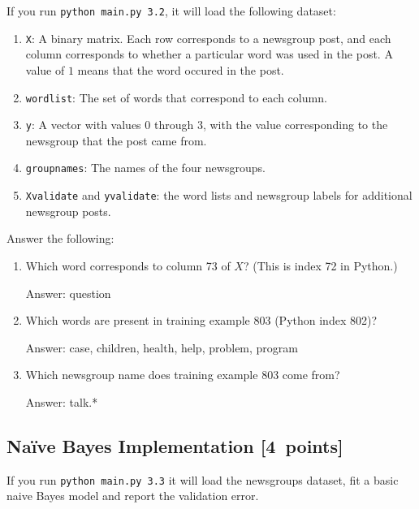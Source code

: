 \documentclass{article}
\newcommand{\blu}[1]{{\textcolor{blu}{#1}}}
\newcommand{\gre}[1]{\textcolor{gre}{#1}}
\newcommand\ans[1]{\par\gre{Answer: #1}}
\let\ask\blu
\newcommand\pts[1]{\textcolor{pointscolour}{[#1~points]}}
\begin{document}
    If you run \texttt{python main.py 3.2}, it will load the following dataset:
    \begin{enumerate}
        \item \texttt{X}: A binary matrix. Each row corresponds to a newsgroup post, and each column corresponds to whether a particular word was used in the post. A value of $1$ means that the word occured in the post.
        \item \texttt{wordlist}: The set of words that correspond to each column.
        \item \texttt{y}: A vector with values $0$ through $3$, with the value corresponding to the newsgroup that the post came from.
        \item \texttt{groupnames}: The names of the four newsgroups.
        \item \texttt{Xvalidate} and \texttt{yvalidate}: the word lists and newsgroup labels for additional newsgroup posts.
    \end{enumerate}
    \ask{Answer the following}:
    \begin{enumerate}
        \item Which word corresponds to column 73 of $X$? (This is index 72 in Python.)
        \ans{question}
        \item Which words are present in training example 803 (Python index 802)?
        \ans{case, children, health, help, problem, program}
        \item Which newsgroup name does training example 803 come from?
        \ans{talk.*}
    \end{enumerate}

    \clearpage
    \subsection{Na\"ive Bayes Implementation \pts{4}}

    If you run \texttt{python main.py 3.3}
    it will load the newsgroups dataset, fit a basic naive Bayes model and report the validation error.
\end{document}
